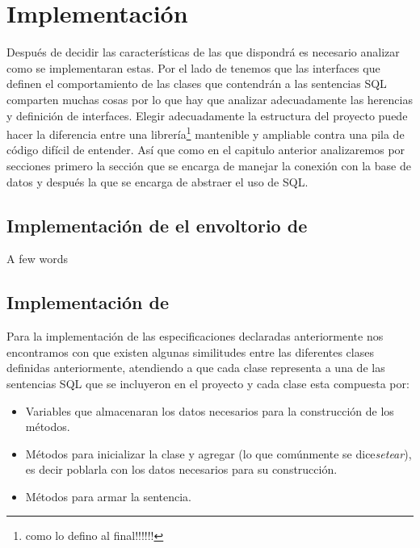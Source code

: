 \chapter{Implementación}
Después de decidir las características de las que dispondrá \jj es necesario analizar como se implementaran estas. Por el lado de \cc tenemos que las interfaces que definen el comportamiento de las clases que contendrán a las sentencias SQL comparten muchas cosas por lo que hay que analizar adecuadamente las herencias y definición de interfaces. Elegir adecuadamente la estructura del proyecto puede hacer la diferencia entre una librería\footnote{como lo defino al final!!!!!!} mantenible y ampliable contra una pila de código difícil de entender. Así que como en el capitulo anterior analizaremos \jj por secciones  primero la sección que se encarga de manejar la conexión con la base de datos y después la que se encarga de abstraer el uso de SQL.






\section{Implementación de el envoltorio de \jj}

A few words




\section{Implementación de \cc}

Para la implementación de las especificaciones declaradas anteriormente nos encontramos con que existen algunas similitudes entre las diferentes clases definidas anteriormente, atendiendo a que cada clase representa a una de las sentencias SQL que se incluyeron en el proyecto y cada clase esta compuesta por:
\begin{itemize}
\item Variables que almacenaran los datos necesarios para la construcción de los métodos.

\item Métodos para inicializar la clase y agregar (lo que comúnmente se dice\textit{setear}), es decir poblarla con los datos necesarios para su construcción.

\item Métodos para armar la sentencia.

\end{itemize}

